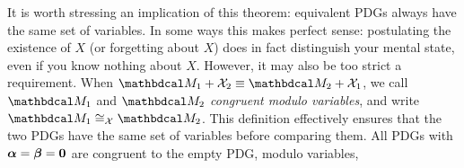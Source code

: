 It is worth stressing an implication of this theorem: equivalent PDGs always have the same set of variables.
In some ways this makes perfect sense: postulating the existence of $X$ (or forgetting about $X$) does in fact distinguish your mental state, even if you know nothing about $X$. 
However, it may also be too strict a requirement.
    When $\dg M_1 + \X_2 \equiv \dg M_2 + \X_1$,
    we call $\dg M_1$ and $\dg M_2$ \emph{congruent modulo variables}, and write $\dg M_1 \cong_\X \dg M_2$.
    This definition 
    effectively ensures that the two PDGs have the same set of variables before comparing them. 
    All PDGs with $\boldsymbol\alpha = \boldsymbol\beta = \mathbf 0$ are congruent to the empty PDG, modulo variables,

